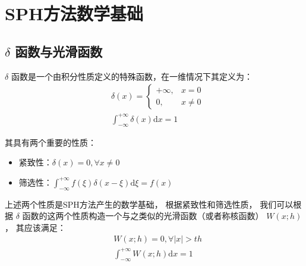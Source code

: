 \section{SPH方法数学基础}

\subsection{$\delta$ 函数与光滑函数}

\begin{frame}
    $\delta$ 函数是一个由积分性质定义的特殊函数，在一维情况下其定义为：
    \begin{equation}
        \begin{aligned}
            &\delta(x) = \begin{cases}
                +\infty, & x = 0 \\
                0, & x \neq 0
            \end{cases}
            \\
            &\int_{-\infty}^{+\infty} \delta(x) \mathrm{d}x = 1
        \end{aligned}
    \end{equation}

    其具有两个重要的性质：

    \begin{itemize}
        \item 紧致性：$\delta(x) = 0, \forall x \neq 0$
        \item 筛选性：$\int_{-\infty}^{+\infty} f(\xi) \delta(x - \xi) \mathrm{d}\xi = f(x)$
    \end{itemize}

    上述两个性质是SPH方法产生的数学基础，
    根据紧致性和筛选性质，
    我们可以根据 $\delta$ 函数的这两个性质构造一个与之类似的光滑函数（或者称核函数） $W(x;h)$ ，
    其应该满足：
    \begin{equation}
        \begin{aligned}
            &W(x;h) = 0, \forall |x| > th\\
            &\int_{-\infty}^{+\infty} W(x;h) \mathrm{d}x = 1
        \end{aligned}
    \end{equation}
\end{frame}

